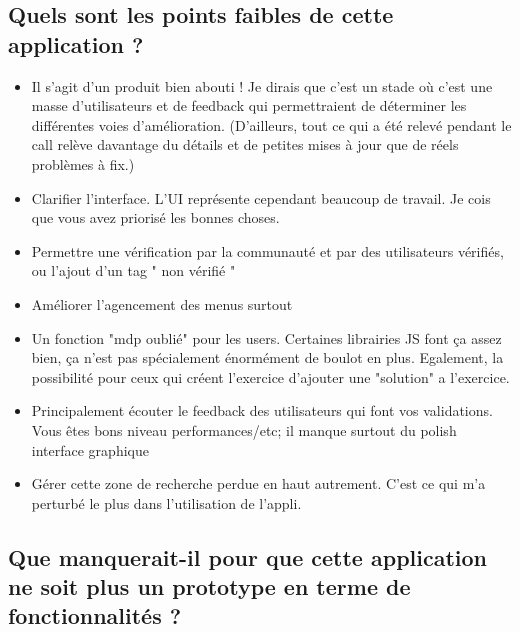 \subsection*{Quels sont les points faibles de cette application ?}

\begin{itemize}
    \item Il s'agit d'un produit bien abouti ! Je dirais que c'est un stade où c'est une masse d'utilisateurs et de feedback qui permettraient de déterminer les différentes voies d'amélioration.
    (D'ailleurs, tout ce qui a été relevé pendant le call relève davantage du détails et de petites mises à jour que de réels problèmes à fix.)
    \item Clarifier l'interface. L'UI représente cependant beaucoup de travail. Je cois que vous avez priorisé les bonnes choses.
    \item Permettre une vérification par la communauté et par des utilisateurs vérifiés, ou l'ajout d'un tag " non vérifié "
    \item Améliorer l'agencement des menus surtout
    \item Un fonction "mdp oublié" pour les users. Certaines librairies JS font ça assez bien, ça n'est pas spécialement énormément de boulot en plus. Egalement, la possibilité pour ceux qui créent l'exercice d'ajouter une "solution" a l'exercice.
    \item Principalement écouter le feedback des utilisateurs qui font vos validations. Vous êtes bons niveau performances/etc; il manque surtout du polish interface graphique
    \item Gérer cette zone de recherche perdue en haut autrement. C'est ce qui m'a perturbé le plus dans l'utilisation de l'appli.
\end{itemize}

\subsection*{Que manquerait-il pour que cette application ne soit plus un prototype en terme de fonctionnalités ?}

